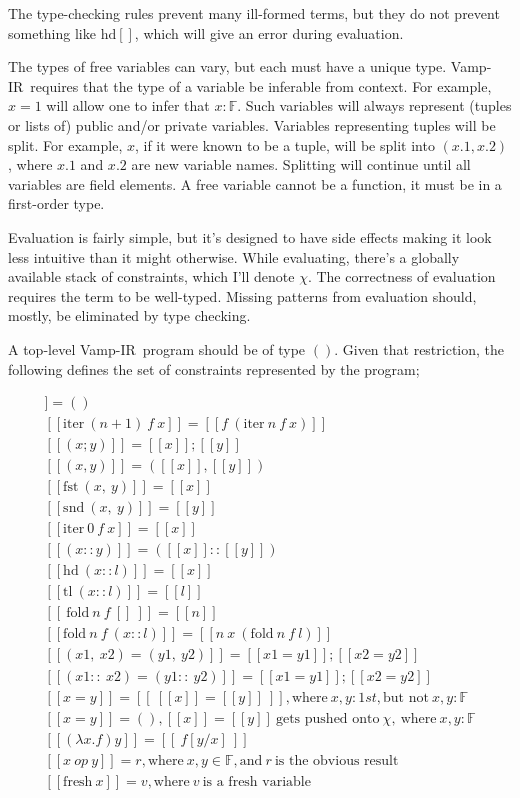 \documentclass{msc}
\newcommand{\vampir}{Vamp-IR}
\begin{document}
The type-checking rules prevent many ill-formed terms, but they do not prevent something like $\text{hd} []$, which will give an error during evaluation.

The types of free variables can vary, but each must have a unique type. \vampir\ requires that the type of a variable be inferable from context. For example, $x = 1$ will allow one to infer that $x : \mathbb{F}$. Such variables will always represent (tuples or lists of) public and/or private variables. Variables representing tuples will be split. For example, $x$, if it were known to be a tuple, will be split into $(x.1, x.2)$, where $x.1$ and $x.2$ are new variable names. Splitting will continue until all variables are field elements. A free variable cannot be a function, it must be in a first-order type.

Evaluation is fairly simple, but it's designed to have side effects making it look less intuitive than it might otherwise. While evaluating, there's a globally available stack of constraints, which I'll denote $\chi$. The correctness of evaluation requires the term to be well-typed. Missing patterns from evaluation should, mostly, be eliminated by type checking.

A top-level \vampir\ program should be of type $()$. Given that restriction, the following defines the set of constraints represented by the program;

\begin{align*}
    [[ () ]] = ()\\
    [[ \text{iter}\ (n+1)\ f\ x ]] = [[f\ (\text{iter}\ n\ f\ x)]]\\
    [[ (x; y) ]] = [[x]]; [[y]]\\
    [[ (x, y) ]] = ([[x]], [[y]])\\
    [[ \text{fst}\ (x,\ y) ]] = [[x]] \\
    [[ \text{snd}\ (x,\ y) ]] = [[y]] \\
    [[ \text{iter}\ 0\ f\ x ]] = [[x]] \\
    [[ (x :: y) ]] = ([[x]] :: [[y]])\\
    [[ \text{hd}\ (x::l) ]] = [[x]] \\
    [[ \text{tl}\ (x::l) ]] = [[l]] \\
    [[\ \text{fold}\ n\ f\ []\ ]] = [[n]] \\
    [[ \text{fold}\ n\ f\ (x::l) ]] = [[n\ x\ (\text{fold}\ n\ f\ l)]] \\
    [[ (x1,\ x2) = (y1,\ y2) ]] = [[x1 = y1]]; [[x2 = y2]]\\
    [[ (x1::\ x2) = (y1::\ y2) ]] = [[x1 = y1]]; [[x2 = y2]]\\
    [[ x = y ]] = [[\ [[x]] = [[y]]\ ]], \text{where}\ x, y : 1st, \text{but not}\ x, y : \mathbb{F}\\ 
    [[ x = y ]] = (), [[x]] = [[y]]\ \text{gets pushed onto}\ \chi,\ \text{where}\ x, y : \mathbb{F}\\
    [[ (\lambda x. f) y ]] = [[\ f[y/x]\ ]]\\
    [[x\ op\ y]] = r, \text{where}\ x, y \in \mathbb{F}, \text{and}\ r\ \text{is the obvious result}  \\
    [[ \text{fresh}\ x ]] = v, \text{where} \ v\ \text{is a fresh variable}
\end{align*}
\end{document}
